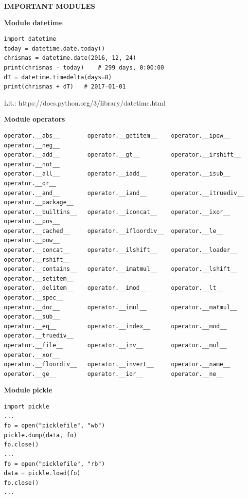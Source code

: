 \documentclass[9pt,a4wide]{extarticle}
\begin{document}
\bigskip
{\LARGE\bf IMPORTANT MODULES}

\bigskip
{\LARGE\bf Module datetime}

\begin{verbatim}
import datetime                                                                               
today = datetime.date.today()
chrismas = datetime.date(2016, 12, 24)
print(chrismas - today)    # 299 days, 0:00:00
dT = datetime.timedelta(days=8)     
print(chrismas + dT)   # 2017-01-01
\end{verbatim}

Lit.: https://docs.python.org/3/library/datetime.html


\bigskip
{\LARGE\bf Module operators}


\begin{verbatim}
operator.__abs__        operator.__getitem__    operator.__ipow__       operator.__neg__
operator.__add__        operator.__gt__         operator.__irshift__    operator.__not__
operator.__all__        operator.__iadd__       operator.__isub__       operator.__or__
operator.__and__        operator.__iand__       operator.__itruediv__   operator.__package__
operator.__builtins__   operator.__iconcat__    operator.__ixor__       operator.__pos__
operator.__cached__     operator.__ifloordiv__  operator.__le__         operator.__pow__
operator.__concat__     operator.__ilshift__    operator.__loader__     operator.__rshift__
operator.__contains__   operator.__imatmul__    operator.__lshift__     operator.__setitem__
operator.__delitem__    operator.__imod__       operator.__lt__         operator.__spec__
operator.__doc__        operator.__imul__       operator.__matmul__     operator.__sub__
operator.__eq__         operator.__index__      operator.__mod__        operator.__truediv__
operator.__file__       operator.__inv__        operator.__mul__        operator.__xor__
operator.__floordiv__   operator.__invert__     operator.__name__       
operator.__ge__         operator.__ior__        operator.__ne__         
\end{verbatim}



\bigskip
{\LARGE\bf Module pickle}

\begin{verbatim}
import pickle
...
fo = open("picklefile", "wb")
pickle.dump(data, fo)
fo.close()
...
fo = open("picklefile", "rb")
data = pickle.load(fo)
fo.close()
...
\end{verbatim}
\end{document}

